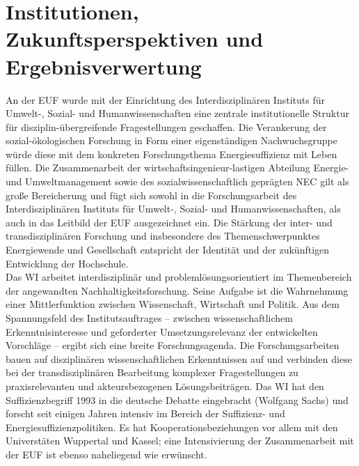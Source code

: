 \documentclass[a4paper,11pt,twoside]{scrartcl}
\begin{document}
\section{Institutionen, Zukunftsperspektiven und Ergebnisverwertung}
An der EUF wurde mit der Einrichtung des Interdisziplinären Instituts für Umwelt-, Sozial- und Humanwissenschaften eine zentrale institutionelle Struktur für disziplin-übergreifende Fragestellungen geschaffen. Die Verankerung der sozial-ökologischen Forschung in Form einer eigenständigen Nachwuchsgruppe würde diese mit dem konkreten Forschungsthema Energiesuffizienz mit Leben füllen. Die Zusammenarbeit der wirtschaftsingenieur-lastigen Abteilung Energie- und Umweltmanagement sowie des sozialwissenschaftlich geprägten NEC gilt als große Bereicherung und fügt sich sowohl in die Forschungsarbeit des Interdisziplinären Instituts für Umwelt-, Sozial- und Humanwissenschaften, als auch in das Leitbild der EUF ausgezeichnet ein. Die Stärkung der inter- und transdisziplinären Forschung und insbesondere des Themenschwerpunktes Energiewende und Gesellschaft entspricht der Identität und der zukünftigen Entwicklung der Hochschule.\\
Das WI arbeitet interdisziplinär und problemlösungsorientiert im Themenbereich der angewandten Nachhaltigkeitsforschung. Seine Aufgabe ist die Wahrnehmung einer Mittlerfunktion zwischen Wissenschaft, Wirtschaft und Politik. Aus dem Spannungsfeld des Institutsauftrages – zwischen wissenschaftlichem Erkenntnisinteresse und geforderter Umsetzungsrelevanz der entwickelten Vorschläge – ergibt sich eine breite Forschungsagenda. Die Forschungsarbeiten bauen auf disziplinären wissenschaftlichen Erkenntnissen auf und verbinden diese bei der transdisziplinären Bearbeitung komplexer Fragestellungen zu praxisrelevanten und akteursbezogenen Lösungsbeiträgen. Das WI hat den Suffizienzbegriff 1993 in die deutsche Debatte eingebracht (Wolfgang Sachs) und forscht seit einigen Jahren intensiv im Bereich der Suffizienz- und Energiesuffizienzpolitiken. Es hat Kooperationsbeziehungen vor allem mit den Universtäten Wuppertal und Kassel; eine Intensivierung der Zusammenarbeit mit der EUF ist ebenso naheliegend wie erwünscht.\\
\end{document}

